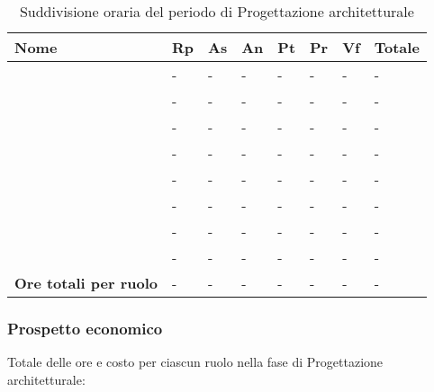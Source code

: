 		\begin{longtable}{ 
			>{\centering}p{} 
			>{\centering}p{}
			>{\centering}p{} 
			>{\centering}p{} 
			>{\centering}p{}
			>{\centering}p{} 
			>{\centering}p{}
			>{\centering\arraybackslash}p{} }
	
			\caption {Suddivisione oraria del periodo di Progettazione architetturale}		\\
			
			\textbf{\color{white}Nome} & 
			\textbf{\color{white}Rp} & 
			\textbf{\color{white}As} & 
			\textbf{\color{white}An} &
			\textbf{\color{white}Pt} &
			\textbf{\color{white}Pr} &
			\textbf{\color{white}Vf} &
			\textbf{\color{white}Totale}
			\tabularnewline  
			\endhead
			
			\VB & - & - & - & - & - & - & - \\
			\LB & - & - & - & - & - & - & - \\
			\NF & - & - & - & - & - & - & - \\
			\EG & - & - & - & - & - & - & - \\
			\FJ & - & - & - & - & - & - & - \\
			\MP & - & - & - & - & - & - & - \\
			\AS & - & - & - & - & - & - & - \\
			\AZ & - & - & - & - & - & - & - \\
			\textbf{Ore totali per ruolo} & - & - & - & - & - & - & - \\
		\end{longtable}
		
	\subsubsection{Prospetto economico}
		Totale delle ore e costo per ciascun ruolo nella fase di Progettazione architetturale:
		
